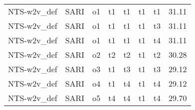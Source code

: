 \begin{tabular}{lllllllr}
 NTS-w2v\_def &      SARI &     o1 &         t1 &       t1 &         t1 &           t1 &                   31.11 \\
 NTS-w2v\_def &      SARI &     o1 &         t1 &       t1 &         t1 &           t3 &                   31.11 \\
 NTS-w2v\_def &      SARI &     o1 &         t1 &       t1 &         t1 &           t4 &                   31.11 \\
 NTS-w2v\_def &      SARI &     o2 &         t2 &       t2 &         t1 &           t2 &                   30.28 \\
 NTS-w2v\_def &      SARI &     o3 &         t1 &       t3 &         t1 &           t3 &                   29.12 \\
 NTS-w2v\_def &      SARI &     o4 &         t1 &       t4 &         t1 &           t4 &                   29.12 \\
 NTS-w2v\_def &      SARI &     o5 &         t4 &       t4 &         t1 &           t4 &                   29.70 \\
\bottomrule
\end{tabular}
